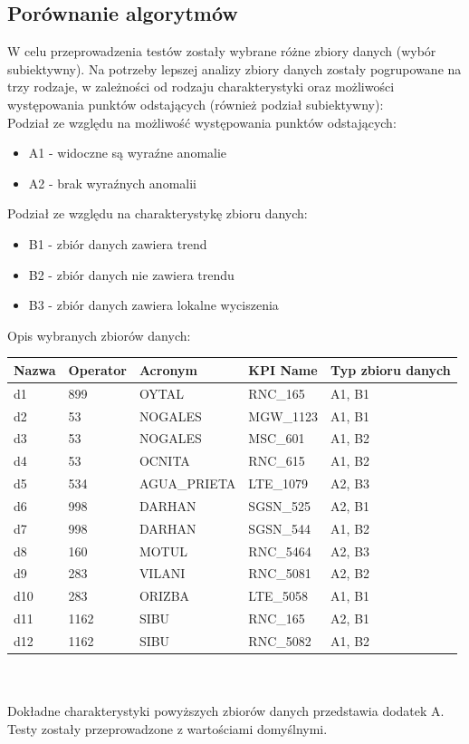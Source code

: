 \documentclass[eng,printmode]{mgr}
\begin{document}
\subsection{Porównanie algorytmów}
W celu przeprowadzenia testów zostały wybrane różne zbiory danych (wybór subiektywny). Na potrzeby lepszej analizy zbiory danych zostały pogrupowane na trzy rodzaje, w zależności od rodzaju charakterystyki oraz możliwości występowania punktów odstających (również podział subiektywny):
\\
Podział ze względu na możliwość występowania punktów odstających:
\begin{itemize}
  \item A1 - widoczne są wyraźne anomalie
  \item A2 - brak wyraźnych anomalii
\end{itemize}
Podział ze względu na charakterystykę zbioru danych:
\begin{itemize}
  \item B1 - zbiór danych zawiera trend
  \item B2 - zbiór danych nie zawiera trendu
  \item B3 - zbiór danych zawiera lokalne wyciszenia
\end{itemize}

Opis wybranych zbiorów danych:
\\
\begingroup
\fontsize{10pt}{12pt}\selectfont

\begin{tabu} to 0.9\textwidth { | X[l] | X[l] | X[l] | X[l] | X[l] |}
\hline
\textbf{Nazwa} & \textbf{Operator} & \textbf{Acronym} & \textbf{KPI Name} & \textbf{Typ zbioru danych}\\
\hline
d1 & 899 & OYTAL & RNC\_165 & A1, B1 \\
\hline
d2 & 53 & NOGALES & MGW\_1123 & A1, B1 \\
\hline
d3 & 53 & NOGALES & MSC\_601 & A1, B2 \\
\hline
d4 & 53 & OCNITA & RNC\_615 & A1, B2\\
\hline
d5 & 534 & AGUA\_PRIETA & LTE\_1079 & A2, B3 \\
\hline
d6 & 998 & DARHAN & SGSN\_525 & A2, B1 \\
\hline
d7 & 998 & DARHAN & SGSN\_544 & A1, B2 \\
\hline
d8 & 160 & MOTUL & RNC\_5464 & A2, B3 \\
\hline
d9 & 283 & VILANI & RNC\_5081 & A2, B2 \\
\hline
d10 & 283 & ORIZBA & LTE\_5058 & A1, B1 \\
\hline
d11 & 1162 & SIBU & RNC\_165 & A2, B1 \\
\hline
d12 & 1162 & SIBU & RNC\_5082 & A1, B2\\
\hline
\end{tabu}
\endgroup
\\\\
Dokładne charakterystyki powyższych zbiorów danych przedstawia dodatek A. Testy zostały przeprowadzone z wartościami domyślnymi.
\end{document}
